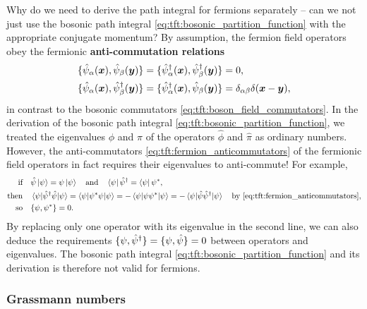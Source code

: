 Why do we need to derive the path integral for fermions separately -- can we not just use the bosonic path integral \eqref{eq:tft:bosonic_partition_function} with the appropriate conjugate momentum?
By assumption, the fermion field operators obey the fermionic \textbf{anti-commutation relations}
\begin{subequations}%
\begin{align}%
	\acomm{\destr_\alpha(\vec{x})}{\destr_\beta(\vec{y})} = \acomm{\creat_\alpha(\vec{x})}{\creat_\beta(\vec{y})} &= 0 , \label{eq:tft:fermion_anticommutator_same} \\
	\acomm{\destr_\alpha(\vec{x})}{\creat_\beta(\vec{y})} = \acomm{\creat_\alpha(\vec{x})}{\destr_\beta(\vec{y})} &= \delta_{\alpha \beta} \delta(\vec{x}-\vec{y}) \label{eq:tft:fermion_anticommutator_diff} ,
\end{align}%
\label{eq:tft:fermion_anticommutators}%
\end{subequations}%
in contrast to the bosonic commutators \eqref{eq:tft:boson_field_commutators}.
In the derivation of the bosonic path integral \eqref{eq:tft:bosonic_partition_function}, we treated the eigenvalues $\phi$ and $\pi$ of the operators $\hat\phi$ and $\hat\pi$ as ordinary numbers.
However, the anti-commutators \eqref{eq:tft:fermion_anticommutators} of the fermionic field operators in fact requires their eigenvalues to anti-commute!
For example,
\begin{equation}
\begin{split}
	\text{if}   \quad & \hat\psi \ket{\psi} = \psi \ket{\psi} \quad \text{and} \quad \bra{\psi} \hat\psi^\dagger = \bra{\psi} {\psi}^* , \\
	\text{then} \quad & \braket{\psi | \hat\psi^\dagger \hat\psi | \psi} = \braket{\psi | {\psi}^* \psi | \psi} = -\braket{\psi | \psi {\psi}^* | \psi} = -\braket{\psi | \hat\psi \hat\psi^\dagger | \psi} \quad \text{by \eqref{eq:tft:fermion_anticommutators}}, \\
	\text{so}   \quad & \{ \psi , {\psi}^* \} = 0 . \\
\end{split}
\label{eq:tft:eigenvalues_must_anticommute}
\end{equation}
By replacing only one operator with its eigenvalue in the second line, we can also deduce the requirements $\{ \psi , \hat\psi^\dagger \} = \{ \psi , \hat\psi \} = 0$ between operators and eigenvalues.
The bosonic path integral \eqref{eq:tft:bosonic_partition_function} and its derivation is therefore not valid for fermions.

\subsubsection{Grassmann numbers}

